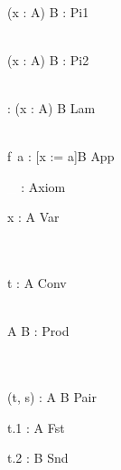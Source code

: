 
\Rule{\PiRuleFpOne}
    {
        \\ 
    }
    {\Gamma \vdash (x : A) \to B : \kind}
    {Pi1}

\Rule{\PiRuleFpTwo}
    {
        \\ 
    }
    {\Gamma \vdash (x : A) \to B : \star}
    {Pi2}

\Rule{\LambdaRuleFp}
    {
        \\ 
    }
    {\Gamma \vdash {} : (x : A) \to B}
    {Lam}

\Rule{\AppRuleFp}
    {
         \\
    }
    {\Gamma \vdash f\ a : [x := a]B}
    {App}

\Rule{\AxiomRuleFp}
    {\textcolor{white}{\_}}
    {\Gamma \vdash \star : \kind}
    {Axiom}

\Rule{\VarRuleFp}
    {
    }
    {\Gamma \vdash x : A}
    {Var}

\Rule{\ConvRuleFp}
    {
         \\
         \\
    }
    {\Gamma \vdash t : A}
    {Conv}

\Rule{\ProductRuleFp}
    {
         \\
    }
    {\Gamma \vdash A \times B : \star}
    {Prod}

\Rule{\PairRuleFp}
    {
         \\
         \\
    }
    {\Gamma \vdash (t, s) : A \times B }
    {Pair}

\Rule{\FirstRuleFp}
    {}
    {\Gamma \vdash t.1 : A}
    {Fst}

\Rule{\SecondRuleFp}
    {}
    {\Gamma \vdash t.2 : B}
    {Snd}

